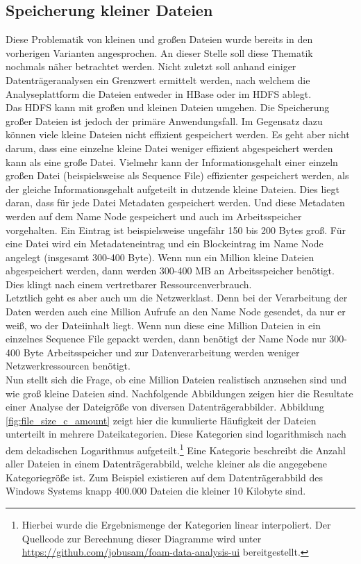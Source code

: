 \subsection{Speicherung kleiner Dateien} 
Diese Problematik von kleinen und großen Dateien wurde bereits in den vorherigen Varianten angesprochen. An dieser Stelle soll diese Thematik nochmals näher betrachtet werden. Nicht zuletzt soll anhand einiger Datenträgeranalysen ein Grenzwert ermittelt werden, nach welchem die Analyseplattform die Dateien entweder in HBase oder im HDFS ablegt.\\

\noindent
Das HDFS kann mit großen und kleinen Dateien umgehen. Die Speicherung großer Dateien ist jedoch der primäre Anwendungsfall. Im Gegensatz dazu können viele kleine Dateien nicht effizient gespeichert werden. 
Es geht aber nicht darum, dass eine einzelne kleine Datei weniger effizient abgespeichert werden kann als eine große Datei. Vielmehr kann der Informationsgehalt einer einzeln großen Datei (beispielsweise als Sequence File) effizienter gespeichert werden, als der gleiche Informationsgehalt aufgeteilt in dutzende kleine Dateien.
Dies liegt daran, dass für jede Datei Metadaten gespeichert werden. Und diese Metadaten werden auf dem Name Node gespeichert und auch im Arbeitsspeicher vorgehalten.\cite{hdfs_architecture} Ein Eintrag ist beispielsweise ungefähr 150 bis 200 Bytes groß. Für eine Datei wird ein Metadateneintrag und ein Blockeintrag im Name Node angelegt (insgesamt 300-400 Byte). Wenn nun ein Million kleine Dateien abgespeichert werden, dann werden 300-400 MB an Arbeitsspeicher benötigt. 
Dies klingt nach einem vertretbarer Ressourcenverbrauch.\\

\noindent
Letztlich geht es aber auch um die Netzwerklast. Denn bei der Verarbeitung der Daten werden auch eine Million Aufrufe an den Name Node gesendet, da nur er weiß, wo der Dateiinhalt liegt. Wenn nun diese eine Million Dateien in ein einzelnes Sequence File gepackt werden, dann benötigt der Name Node nur 300-400 Byte Arbeitsspeicher und zur Datenverarbeitung werden weniger Netzwerkressourcen benötigt.\\

\noindent
Nun stellt sich die Frage, ob eine Million Dateien realistisch anzusehen sind und wie groß kleine Dateien sind. Nachfolgende Abbildungen zeigen hier die Resultate einer Analyse der Dateigröße von diversen Datenträgerabbilder. Abbildung \ref{fig:file_size_c_amount} zeigt hier die kumulierte Häufigkeit der Dateien unterteilt in mehrere Dateikategorien. Diese Kategorien sind logarithmisch nach dem dekadischen Logarithmus aufgeteilt.\footnote{Hierbei wurde die Ergebnismenge der Kategorien linear interpoliert. Der Quellcode zur Berechnung dieser Diagramme wird unter \url{https://github.com/jobusam/foam-data-analysis-ui} bereitgestellt. } Eine Kategorie beschreibt die Anzahl aller Dateien in einem Datenträgerabbild, welche kleiner als die angegebene Kategoriegröße ist. Zum Beispiel existieren auf dem Datenträgerabbild des Windows Systems knapp 400.000 Dateien die kleiner 10 Kilobyte sind.\\


